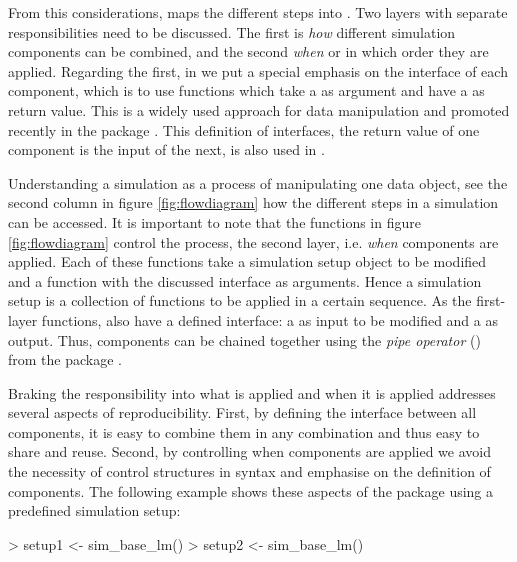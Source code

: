 \documentclass[article]{ajs}
\begin{document}
From this considerations,  maps the different steps into . Two layers with separate responsibilities need to be discussed. The first is \textit{how} different simulation components can be combined, and the second \textit{when} or in which order they are applied. Regarding the first, in  we put a special emphasis on the interface of each component, which is to use functions which take a  as argument and have a  as return value. This is a widely used approach for data manipulation and promoted recently in the package  \citep{wickham14}. This definition of interfaces, the return value of one component is the input of the next, is also used in .

Understanding a simulation as a process of manipulating one data object, see the second column in figure \ref{fig:flowdiagram} how the different steps in a simulation can be accessed. It is important to note that the functions in figure \ref{fig:flowdiagram} control the process, the second layer, i.e. \textit{when} components are applied. Each of these functions take a simulation setup object to be modified and a function with the discussed interface as arguments. Hence a simulation setup is a collection of functions to be applied in a certain sequence. As the first-layer functions, also have a defined interface: a  as input to be modified and a  as output. Thus, components can be chained together using the \textit{pipe operator} (\proglang{\%>\%}) from the package  \citep{bache14}.

Braking the responsibility into what is applied and when it is applied addresses several aspects of reproducibility. First, by defining the interface between all components, it is easy to combine them in any combination and thus easy to share and reuse. Second, by controlling when components are applied we avoid the necessity of control structures in syntax and emphasise on the definition of components. The following example shows these aspects of the package using a predefined simulation setup:

\begin{Schunk}
\begin{Sinput}
> setup1 <- sim_base_lm() %
> setup2 <- sim_base_lm() %
\end{Sinput}
\end{Schunk}
\end{document}
